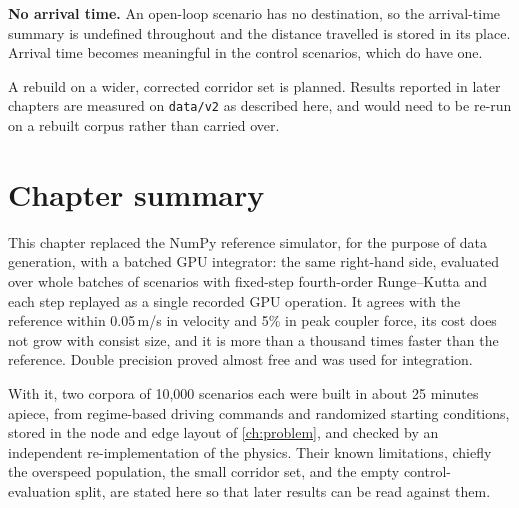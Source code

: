 \textbf{No arrival time.} An open-loop scenario has no destination, so the arrival-time summary is undefined throughout and the distance travelled is stored in its place. Arrival time becomes meaningful in the control scenarios, which do have one.

A rebuild on a wider, corrected corridor set is planned. Results reported in later chapters are measured on \texttt{data/v2} as described here, and would need to be re-run on a rebuilt corpus rather than carried over.

\section{Chapter summary}

This chapter replaced the NumPy reference simulator, for the purpose of data generation, with a batched GPU integrator: the same right-hand side, evaluated over whole batches of scenarios with fixed-step fourth-order Runge--Kutta and each step replayed as a single recorded GPU operation. It agrees with the reference within 0.05\,m/s in velocity and 5\% in peak coupler force, its cost does not grow with consist size, and it is more than a thousand times faster than the reference. Double precision proved almost free and was used for integration.

With it, two corpora of 10,000 scenarios each were built in about 25 minutes apiece, from regime-based driving commands and randomized starting conditions, stored in the node and edge layout of \cref{ch:problem}, and checked by an independent re-implementation of the physics. Their known limitations, chiefly the overspeed population, the small corridor set, and the empty control-evaluation split, are stated here so that later results can be read against them.
